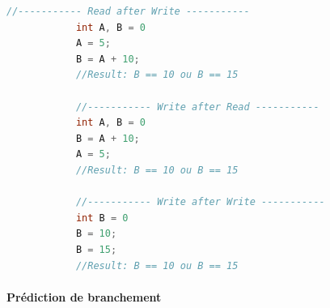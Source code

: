             
            
            \begin{lstlisting}[language=C, caption=Exemples de dépendances entre deux instructions., float,floatplacement=H, label=code_dependances]
            //----------- Read after Write -----------
            int A, B = 0
            A = 5;
            B = A + 10;
            //Result: B == 10 ou B == 15
            
            //----------- Write after Read -----------
            int A, B = 0
            B = A + 10;
            A = 5;
            //Result: B == 10 ou B == 15 
             
            //----------- Write after Write -----------
            int B = 0
            B = 10;
            B = 15;
            //Result: B == 10 ou B == 15
            \end{lstlisting}






        \paragraph{Prédiction de branchement}\label{sec:branch_predictor}


